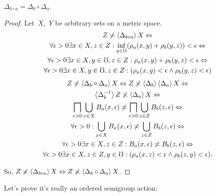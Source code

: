\begin{lem}
$\Delta_{b\circ a} = \Delta_b\circ\Delta_a$.
\end{lem}

\begin{proof}
Let~$X$,~$Y$ be arbitrary sets on a metric space.
\begin{multline*}
Z\not\asymp\left\langle \Delta_{b\circ a}\right\rangle X \Leftrightarrow \\
\forall\epsilon>0\exists x\in X,z\in Z:\inf_{y\in\mho}(\rho_a(x,y)+\rho_b(y,z))<\epsilon \Leftrightarrow \\
\forall\epsilon>0\exists x\in X,y\in\mho,z\in Z:\rho_a(x,y)+\rho_b(y,z)<\epsilon \Leftrightarrow \\
\forall\epsilon>0\exists x\in X,y\in\mho,z\in Z:(\rho_a(x,y)<\epsilon\land\rho_b(y,z)<\epsilon)
\end{multline*}
\begin{multline*}
Z\not\asymp\left\langle \Delta_b\circ\Delta_a\right\rangle X \Leftrightarrow
Z\not\asymp\left\langle \Delta_b\right\rangle\left\langle \Delta_a\right\rangle X\Leftrightarrow\\
\left\langle \Delta_b^{-1}\right\rangle Z\not\asymp\left\langle \Delta_a\right\rangle X \Leftrightarrow\\
\bigsqcap_{\epsilon>0}\bigcup_{x\in X}B_a(x,\epsilon) \not\asymp\bigsqcap_{\epsilon>0}\bigcup_{z\in Z}B_b(z,\epsilon) \Leftrightarrow \\
\forall\epsilon>0:\bigcup_{x\in X}B_a(x,\epsilon) \not\asymp\bigcup_{z\in Z}B_b(z,\epsilon) \Leftrightarrow \\
\forall\epsilon>0\exists x\in X,z\in Z:B_a(x,\epsilon)\not\asymp B_b(z,\epsilon) \Leftrightarrow \\
\forall\epsilon>0\exists x\in X,z\in Z,y\in\mho:(\rho_a(x,z)<\epsilon\land\rho_b(z,y)<\epsilon).
\end{multline*}

So, $Z\not\asymp\left\langle \Delta_{b\circ a}\right\rangle X \Leftrightarrow Z\not\asymp\left\langle \Delta_b\circ\Delta_a\right\rangle X$.
\end{proof}

Let's prove it's really an ordered semigroup action:

